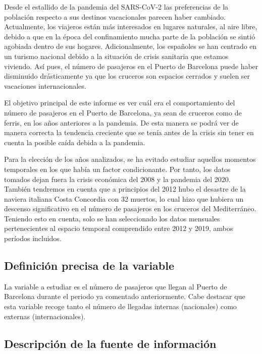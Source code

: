 \documentclass[
]{article}
\begin{document}
Desde el estallido de la pandemia del SARS-CoV-2 las preferencias de la
población respecto a sus destinos vacacionales parecen haber cambiado.
Actualmente, los viajeros están más interesados en lugares naturales, al
aire libre, debido a que en la época del confinamiento mucha parte de la
población se sintió agobiada dentro de sus hogares. Adicionalmente, los
españoles se han centrado en un turismo nacional debido a la situación
de crisis sanitaria que estamos viviendo. Así pues, el número de
pasajeros en el Puerto de Barcelona puede haber disminuido drásticamente
ya que los cruceros son espacios cerrados y suelen ser vacaciones
internacionales.

El objetivo principal de este informe es ver cuál era el comportamiento
del número de pasajeros en el Puerto de Barcelona, ya sean de cruceros
como de ferris, en los años anteriores a la pandemia. De esta manera se
podrá ver de manera correcta la tendencia creciente que se tenía antes
de la crisis sin tener en cuenta la posible caída debida a la pandemia.

Para la elección de los años analizados, se ha evitado estudiar aquellos
momentos temporales en los que había un factor condicionante. Por tanto,
los datos tomados dejan fuera la crisis económica del 2008 y la pandemia
del 2020. También tendremos en cuenta que a principios del 2012 hubo el
desastre de la naviera italiana Costa Concordia con 32 muertos, lo cual
hizo que hubiera un descenso significativo en el número de pasajeros en
los cruceros del Mediterráneo. Teniendo esto en cuenta, solo se han
seleccionado los datos mensuales pertenecientes al espacio temporal
comprendido entre 2012 y 2019, ambos períodos incluidos.

\medskip

\hypertarget{definiciuxf3n-precisa-de-la-variable}{%
\subsection{Definición precisa de la
variable}\label{definiciuxf3n-precisa-de-la-variable}}

La variable a estudiar es el número de pasajeros que llegan al Puerto de
Barcelona durante el periodo ya comentado anteriormente. Cabe destacar
que esta variable recoge tanto el número de llegadas internas
(nacionales) como externas (internacionales).

\hypertarget{descripciuxf3n-de-la-fuente-de-informaciuxf3n}{%
\subsection{Descripción de la fuente de
información}\label{descripciuxf3n-de-la-fuente-de-informaciuxf3n}}
\end{document}
